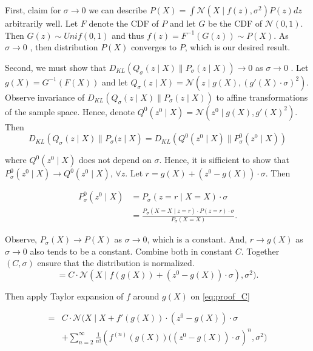 \documentclass[11pt]{article}
\theoremstyle{plain}
\theoremstyle{definition}
\theoremstyle{plain}
\begin{document}
First, claim for $\sigma\rightarrow0$ we can describe $P(X)=\int\mathcal{N}(X\mid f(z),\sigma^{2})P(z)dz$
arbitrarily well. Let $F$ denote the CDF of $P$ and let $G$ be
the CDF of $\mathcal{N}(0,1)$. Then $G(z)\sim Unif(0,1)$ and thus
$f(z)=F^{-1}(G(z))\sim P(X)$. As $\sigma\rightarrow0$ , then distribution
$P(X)$ converges to $P$, which is our desired result.

Second, we must show that $D_{KL}\left(Q_{\sigma}(z\mid X)\rVert P_{\sigma}(z\mid X)\right)\rightarrow0$
as $\sigma\rightarrow0$ . Let $g(X)=G^{-1}(F(X))$ and let $Q_{\sigma}(z\mid X)=\mathcal{N}(z\mid g(X),(g'(X)\cdot\sigma)^{2})$.
Observe invariance of $D_{KL}\left(Q_{\sigma}(z\mid X)\rVert P_{\sigma}(z\mid X)\right)$
to affine transformations of the sample space. Hence, denote $Q^{0}(z^{0}\mid X)=\mathcal{N}(z^{0}\mid g(X),g'(X)^{2})$.
Then
\begin{equation}
D_{KL}\left(Q_{\sigma}(z\mid X)\rVert P_{\sigma}(z\mid X\right)=D_{KL}\left(Q^{0}(z^{0}\mid X)\rVert P_{\sigma}^{0}(z^{0}\mid X)\right)
\end{equation}

where $Q^{0}(z^{0}\mid X)$ does not depend on $\sigma$. Hence, it
is sifficient to show that $P_{\sigma}^{0}(z^{0}\mid X)\rightarrow Q^{0}(z^{0}\mid X),\,\forall z$.
Let $r=g(X)+(z^{0}-g(X))\cdot\sigma$. Then

\begin{equation}
\begin{aligned}P_{\sigma}^{0}(z^{0}\mid X) & =P_{\sigma}(z=r\mid X=X)\cdot\sigma\\
 & =\frac{P_{\sigma}(X=X\mid z=r)\cdot P(z=r)\cdot\sigma}{P_{\sigma}(X=X)}.
\end{aligned}
\end{equation}

Observe, $P_{\sigma}(X)\rightarrow P(X)$ as $\sigma\rightarrow0$,
which is a constant. And, $r\rightarrow g(X)$ as $\sigma\rightarrow0$
also tends to be a constant. Combine both in constant $C$. Together
$(C,\sigma)$ ensure that the distribution is normalized. 
\begin{equation}
=C\cdot\mathcal{N}(X\mid f(g(X))+(z^{0}-g(X))\cdot\sigma),\sigma^{2}).\label{eq:proof_C}
\end{equation}

Then apply Taylor expansion of $f$ around $g(X)$ on \eqref{eq:proof_C}

\begin{equation}
\begin{aligned}= & C\cdot\mathcal{N}(X\mid X+f'(g(X))\cdot(z^{0}-g(X))\cdot\sigma\\
 & +\sum_{n=2}^{\infty}\frac{1}{n!}\left(f^{(n)}(g(X))((z^{0}-g(X))\cdot\sigma\right)^{n},\sigma^{2})
\end{aligned}
\label{eq:proof_taylor}
\end{equation}
\end{document}
